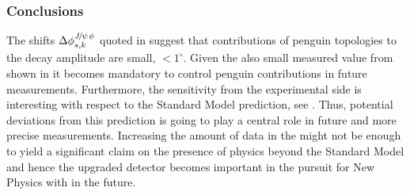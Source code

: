 \subsubsection{Conclusions}
The shifts $\Delta\phi^{{J\mskip -3mu/\mskip -2mu\psi\mskip 2mu}\phi}_{s,{k}}$ quoted in 
suggest that contributions of penguin topologies to the \BsJpsiPhi decay amplitude are
small, $<1^\circ$. Given the also small \phis measured value from \lhcb shown in 
it becomes mandatory to control penguin contributions in future \phis measurements.
Furthermore, the sensitivity from the experimental side is interesting with respect to
the Standard Model prediction, see . Thus, potential deviations from this
prediction is going to play a central role in future and more precise \phis measurements.
Increasing the amount of data in the \lhc \runtwo might not be enough to yield
a significant claim on the presence of physics beyond the Standard Model and hence
the upgraded \lhcb detector becomes important in the pursuit for New Physics with \phis in the future.
